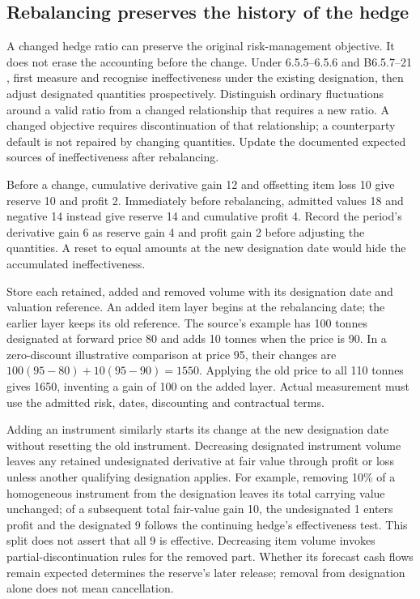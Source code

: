 \hypertarget{rebalancing-preserves-the-history-of-the-hedge}{%
\subsection{Rebalancing preserves the history of the hedge}\label{rebalancing-preserves-the-history-of-the-hedge}}

A changed hedge ratio can preserve the original risk-management objective. It does not erase the accounting before the change. Under 6.5.5--6.5.6 and B6.5.7--21 \citep[6.5.5--6.5.6 and B6.5.7--21]{aasb9dated}, first measure and recognise ineffectiveness under the existing designation, then adjust designated quantities prospectively. Distinguish ordinary fluctuations around a valid ratio from a changed relationship that requires a new ratio. A changed objective requires discontinuation of that relationship; a counterparty default is not repaired by changing quantities. Update the documented expected sources of ineffectiveness after rebalancing.

Before a change, cumulative derivative gain 12 and offsetting item loss 10 give reserve 10 and profit 2. Immediately before rebalancing, admitted values 18 and negative 14 instead give reserve 14 and cumulative profit 4. Record the period's derivative gain 6 as reserve gain 4 and profit gain 2 before adjusting the quantities. A reset to equal amounts at the new designation date would hide the accumulated ineffectiveness.

Store each retained, added and removed volume with its designation date and valuation reference. An added item layer begins at the rebalancing date; the earlier layer keeps its old reference. The source's example has 100 tonnes designated at forward price 80 and adds 10 tonnes when the price is 90. In a zero-discount illustrative comparison at price 95, their changes are \(100(95-80)+10(95-90)=1550\). Applying the old price to all 110 tonnes gives 1650, inventing a gain of 100 on the added layer. Actual measurement must use the admitted risk, dates, discounting and contractual terms.

Adding an instrument similarly starts its change at the new designation date without resetting the old instrument. Decreasing designated instrument volume leaves any retained undesignated derivative at fair value through profit or loss unless another qualifying designation applies. For example, removing 10\% of a homogeneous instrument from the designation leaves its total carrying value unchanged; of a subsequent total fair-value gain 10, the undesignated 1 enters profit and the designated 9 follows the continuing hedge's effectiveness test. This split does not assert that all 9 is effective. Decreasing item volume invokes partial-discontinuation rules for the removed part. Whether its forecast cash flows remain expected determines the reserve's later release; removal from designation alone does not mean cancellation.

